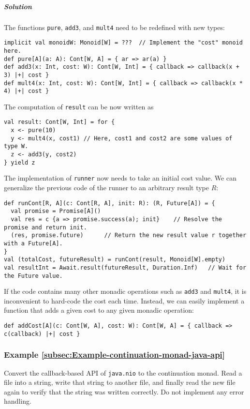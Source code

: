 \subparagraph{Solution}

The functions \lstinline!pure!, \lstinline!add3!, and \lstinline!mult4!
need to be redefined with new types:
\begin{lstlisting}
implicit val monoidW: Monoid[W] = ???  // Implement the "cost" monoid here.
def pure[A](a: A): Cont[W, A] = { ar => ar(a) }
def add3(x: Int, cost: W): Cont[W, Int] = { callback => callback(x + 3) |+| cost }
def mult4(x: Int, cost: W): Cont[W, Int] = { callback => callback(x * 4) |+| cost }
\end{lstlisting}
The computation of \lstinline!result! can be now written as
\begin{lstlisting}
val result: Cont[W, Int] = for {
  x <- pure(10)
  y <- mult4(x, cost1) // Here, cost1 and cost2 are some values of type W.
  z <- add3(y, cost2)
} yield z
\end{lstlisting}
The implementation of \lstinline!runner! now needs to take an initial
cost value. We can generalize the previous code of the runner to an
arbitrary result type $R$:
\begin{lstlisting}
def runCont[R, A](c: Cont[R, A], init: R): (R, Future[A]) = {
  val promise = Promise[A]()
  val res = c {a => promise.success(a); init}    // Resolve the promise and return init.
  (res, promise.future)      // Return the new result value r together with a Future[A].
}
val (totalCost, futureResult) = runCont(result, Monoid[W].empty)
val resultInt = Await.result(futureResult, Duration.Inf)   // Wait for the Future value.
\end{lstlisting}

If the code contains many other monadic operations such as \lstinline!add3!
and \lstinline!mult4!, it is inconvenient to hard-code the cost each
time. Instead, we can easily implement a function that adds a given
cost to any given monadic operation:
\begin{lstlisting}
def addCost[A](c: Cont[W, A], cost: W): Cont[W, A] = { callback => c(callback) |+| cost }
\end{lstlisting}


\subsubsection{Example \label{subsec:Example-continuation-monad-java-api}\ref{subsec:Example-continuation-monad-java-api}}

Convert the callback-based API of \lstinline!java.nio! to the continuation
monad. Read a file into a string, write that string to another file,
and finally read the new file again to verify that the string was
written correctly. Do not implement any error handling.

